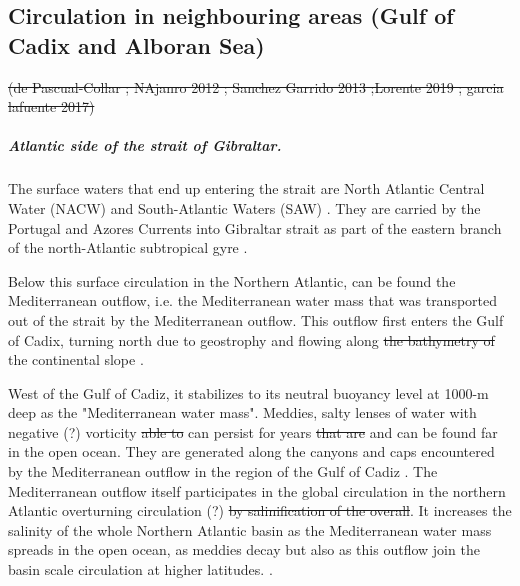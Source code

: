 \subsection{Circulation in neighbouring areas (Gulf of Cadix and Alboran Sea)}
 \color{blue}\sout{(de Pascual-Collar ; NAjanro 2012 ; Sanchez Garrido 2013 ;Lorente 2019 ; garcia lafuente 2017)} 
 \color{black}

\subparagraph{Atlantic side \color{blue}of the strait of Gibraltar. \color{black}}
The surface waters that end up entering the strait are \color{blue} North Atlantic Central Water (NACW) \color{black} and South-Atlantic Waters (SAW) \color{black} \citep{millot_2014,naranjo_2015}. They are carried by the Portugal and Azores Currents into  \color{blue}Gibraltar strait \color{black} as part of the eastern branch of the north-Atlantic subtropical gyre \citep{barton_2001}.

Below this surface circulation \color{blue} in the Northern Atlantic\color{black}, can \color{blue}be found \color{black} the Mediterranean outflow, \color{blue} i.e. \color{black}the Mediterranean water mass that was transported out of the strait by the Mediterranean outflow. \color{blue}This outflow first enters \color{black} the Gulf of Cadix,  \color{blue}turning \color{black} north due to geostrophy and flowing along \sout{the bathymetry of} the continental slope \citep{price_1993,gasser_2017}. 

\color{blue} West of the Gulf of Cadiz, it \color{black} stabilizes to its neutral buoyancy level at \color{blue} 1000-m deep \color{black} as the "Mediterranean water mass"\citep{price_1993}. Meddies, salty lenses of water with negative  \color{blue}(?) \color{black} vorticity \sout{able to} \color{blue}can  \color{black} persist for years \sout{that are} \color{blue} and can be found \color{black} far in the open ocean. \color{blue}They \color{black} are generated along the canyons and caps encountered by the Mediterranean outflow in the region of the Gulf of Cadiz \citep{bashmachnikov_2015}. The Mediterranean outflow itself participates in the global circulation \color{blue}in the \color{blue}northern Atlantic \color{black} overturning circulation \color{blue}(?) \color{black} \sout{by salinification of the overall}. \color{blue} It increases the salinity of the whole Northern Atlantic basin as the Mediterranean water mass spreads in the open ocean, as meddies decay but also as this outflow join the basin scale circulation at higher latitudes. \color{black} \citep{price_1993,jia_2007}.

